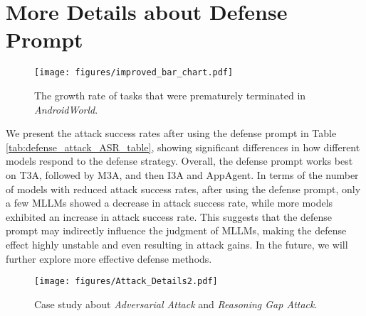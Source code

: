 \section{More Details about Defense Prompt}
\label{appendix:More Details about Defense Prompt}




\begin{figure}[t]
    \centering
    \texttt{[image: figures/improved\_bar\_chart.pdf]}
    \caption{The growth rate of tasks that were prematurely terminated in \textit{AndroidWorld}.}
    \label{fig:growth_rate_of_task}
\end{figure}



We present the attack success rates after using the defense prompt in Table \ref{tab:defense_attack_ASR_table}, showing significant differences in how different models respond to the defense strategy. Overall, the defense prompt works best on T3A, followed by M3A, and then I3A and AppAgent. In terms of the number of models with reduced attack success rates, after using the defense prompt, only a few MLLMs showed a decrease in attack success rate, while more models exhibited an increase in attack success rate. This suggests that the defense prompt may indirectly influence the judgment of MLLMs, making the defense effect highly unstable and even resulting in attack gains. In the future, we will further explore more effective defense methods.




\begin{figure*}[t]
    \centering
    \texttt{[image: figures/Attack\_Details2.pdf]} %
    \caption{Case study about \textit{Adversarial Attack} and \textit{Reasoning Gap Attack}.}
    \label{fig:reasoning details}
\end{figure*}
